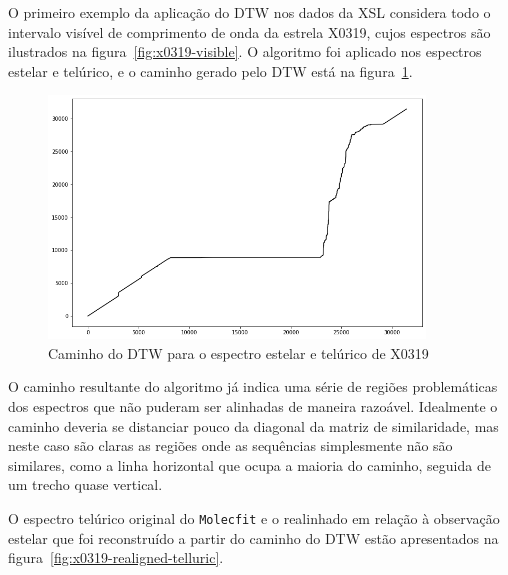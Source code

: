 O primeiro exemplo da aplicação do DTW nos dados da XSL considera todo o intervalo visível de comprimento de onda da estrela X0319, cujos espectros são ilustrados na figura~\ref{fig:x0319-visible}. O algoritmo foi aplicado nos espectros estelar e telúrico, e o caminho gerado pelo DTW está na figura~\ref{fig:x0319-warp-path}.

\begin{figure}[htb]
\centering
\includegraphics[width=10cm]{figuras/x0319_warp_path.png}
\caption{Caminho do DTW para o espectro estelar e telúrico de X0319}
\label{fig:x0319-warp-path}
\end{figure}

O caminho resultante do algoritmo já indica uma série de regiões problemáticas dos espectros que não puderam ser alinhadas de maneira razoável. Idealmente o caminho deveria se distanciar pouco da diagonal da matriz de similaridade, mas neste caso são claras as regiões onde as sequências simplesmente não são similares, como a linha horizontal que ocupa a maioria do caminho, seguida de um trecho quase vertical.

O espectro telúrico original do \texttt{Molecfit} e o realinhado em relação à observação estelar que foi reconstruído a partir do caminho do DTW estão apresentados na figura~\ref{fig:x0319-realigned-telluric}.

